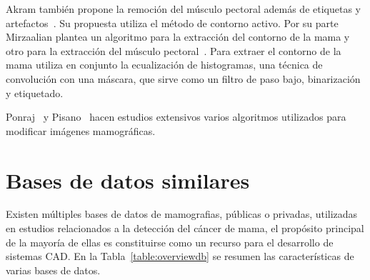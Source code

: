 Akram también propone la remoción del músculo pectoral además de etiquetas y
artefactos~\cite{akram2013preprocessing}. Su propuesta utiliza el método de
contorno activo. Por su parte Mirzaalian plantea un algoritmo para la
extracción del contorno de la mama y otro para la extracción del músculo
pectoral~\cite{mirzaalian2007pre}. Para extraer el contorno de la mama utiliza
en conjunto la ecualización de histogramas, una técnica de convolución con una
máscara, que sirve como un filtro de paso bajo, binarización y etiquetado.


Ponraj~\cite{ponraj2011survey} y Pisano~\cite{pisano2000image} hacen estudios
extensivos varios algoritmos utilizados para modificar imágenes mamográficas.

\section{Bases de datos similares}

Existen múltiples bases de datos de mamografias, públicas o privadas,
utilizadas en estudios relacionados a la detección del cáncer de mama, el
propósito principal de la mayoría de ellas es constituirse como un recurso para
el desarrollo de sistemas CAD. En la Tabla~\ref{table:overviewdb} se resumen
las características de varias bases de datos.

